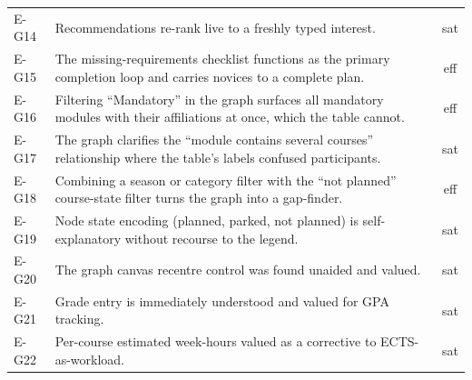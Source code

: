 \begin{longtable}{p{1.6cm}p{10.6cm}c}
    E-G14 & Recommendations re-rank live to a freshly typed interest. & sat \\
    E-G15 & The missing-requirements checklist functions as the primary completion loop and carries novices to a complete plan. & eff \\
    E-G16 & Filtering \enquote{Mandatory} in the graph surfaces all mandatory modules with their affiliations at once, which the table cannot. & eff \\
    E-G17 & The graph clarifies the \enquote{module contains several courses} relationship where the table's labels confused participants. & sat \\
    E-G18 & Combining a season or category filter with the \enquote{not planned} course-state filter turns the graph into a gap-finder. & eff \\
    E-G19 & Node state encoding (planned, parked, not planned) is self-explanatory without recourse to the legend. & sat \\
    E-G20 & The graph canvas recentre control was found unaided and valued. & sat \\
    E-G21 & Grade entry is immediately understood and valued for GPA tracking. & sat \\
    E-G22 & Per-course estimated week-hours valued as a corrective to ECTS-as-workload. & sat \\
\end{longtable}
\normalsize


